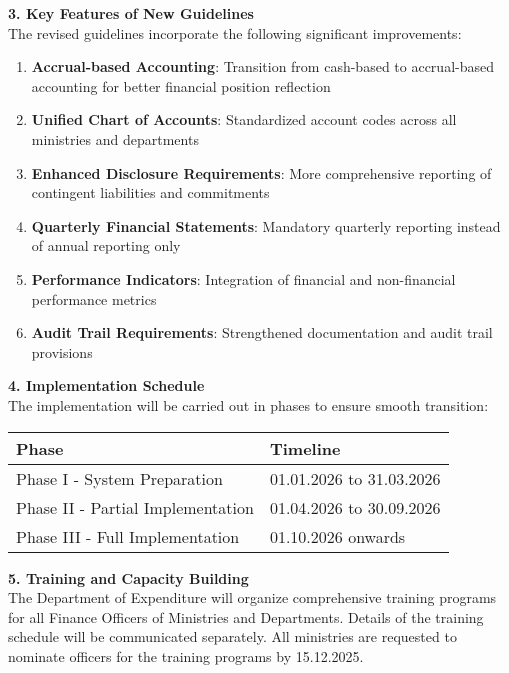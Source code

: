 \documentclass[12pt,a4paper]{article}
\newcommand{\officeline}[1]{\textbf{#1}}
\begin{document}
\vspace{0.3cm}

\officeline{3. Key Features of New Guidelines}\\
The revised guidelines incorporate the following significant improvements:

\begin{enumerate}
    \item \textbf{Accrual-based Accounting}: Transition from cash-based to accrual-based accounting for better financial position reflection
    \item \textbf{Unified Chart of Accounts}: Standardized account codes across all ministries and departments
    \item \textbf{Enhanced Disclosure Requirements}: More comprehensive reporting of contingent liabilities and commitments
    \item \textbf{Quarterly Financial Statements}: Mandatory quarterly reporting instead of annual reporting only
    \item \textbf{Performance Indicators}: Integration of financial and non-financial performance metrics
    \item \textbf{Audit Trail Requirements}: Strengthened documentation and audit trail provisions
\end{enumerate}

\vspace{0.3cm}

\officeline{4. Implementation Schedule}\\
The implementation will be carried out in phases to ensure smooth transition:

\begin{table}[h]
\centering
\begin{tabular}{@{}ll@{}}
\toprule
\textbf{Phase} & \textbf{Timeline} \\
\midrule
Phase I - System Preparation & 01.01.2026 to 31.03.2026 \\
Phase II - Partial Implementation & 01.04.2026 to 30.09.2026 \\
Phase III - Full Implementation & 01.10.2026 onwards \\
\bottomrule
\end{tabular}
\end{table}

\vspace{0.3cm}

\officeline{5. Training and Capacity Building}\\
The Department of Expenditure will organize comprehensive training programs for all Finance Officers of Ministries and Departments. Details of the training schedule will be communicated separately. All ministries are requested to nominate officers for the training programs by 15.12.2025.
\end{document}
